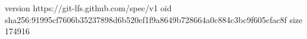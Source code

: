 version https://git-lfs.github.com/spec/v1
oid sha256:91995cf7606b35237898d6b520ef1f9a8649b728664a0c884c3bc9f605cfac8f
size 174916
